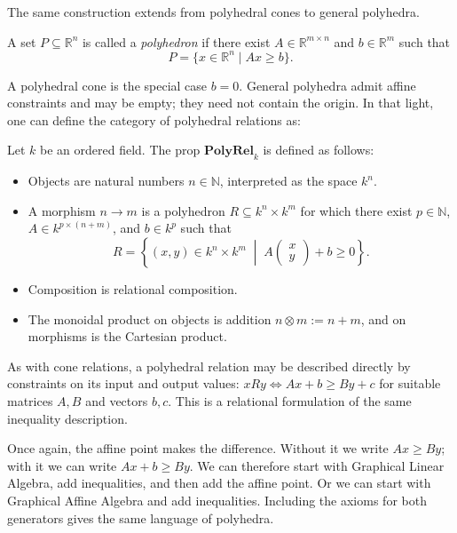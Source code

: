 The same construction extends from polyhedral cones to general polyhedra.

\begin{definition}\label{polyform}
    A set $P \subseteq \mathbb{R}^n$ is called a \emph{polyhedron} if there
    exist $A \in \mathbb{R}^{m \times n}$ and $b \in \mathbb{R}^m$ such that
    \[
        P = \{x \in \mathbb{R}^n \mid Ax \ge b\}.
    \]
\end{definition}

A polyhedral cone is the special case $b=0$. General polyhedra admit affine
constraints and may be empty; they need not contain the origin. In that light,
one can define the category of polyhedral relations as:

\begin{definition}
    Let $k$ be an ordered field. The prop $\mathbf{PolyRel}_k$ is defined
    as follows:
    \begin{itemize}
        \item Objects are natural numbers $n \in \mathbb{N}$, interpreted
            as the space $k^n$.
        \item A morphism $n \to m$ is a polyhedron
            $R \subseteq k^n \times k^m$
            for which there exist $p \in \mathbb{N}$,
            $A \in k^{p \times (n+m)}$, and $b \in k^p$ such that
            \[
                R = \left\{ (x,y) \in k^n \times k^m \;\middle|\;
                A \begin{pmatrix} x \\ y \end{pmatrix} + b \ge 0 \right\}.
            \]
        \item Composition is relational composition.
        \item The monoidal product on objects is addition $n \otimes m := n+m$,
            and on morphisms is the Cartesian product.
    \end{itemize}
\end{definition}

As with cone relations, a polyhedral relation may be described directly by
constraints on its input and output values:
$xRy \iff Ax+b\ge By+c$ for suitable matrices $A,B$ and vectors $b,c$.
This is a relational formulation of the same inequality description.


Once again, the affine point makes the difference. Without it we write
$Ax\ge By$; with it we can write $Ax+b\ge By$. We can therefore start
with Graphical Linear Algebra, add inequalities, and then add the affine point.
Or we can start with Graphical Affine Algebra and add inequalities. Including the
axioms for both generators gives the same language of polyhedra.

